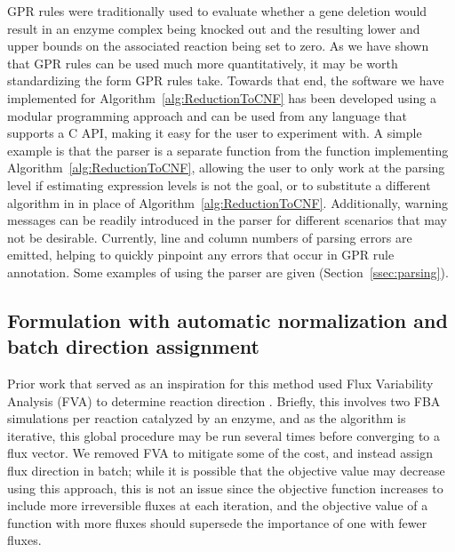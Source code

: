 GPR rules were traditionally used to evaluate whether a gene deletion
would result in an enzyme complex being knocked out and the resulting
lower and upper bounds on the associated reaction being set to
zero. As we have shown that GPR rules can be used much more
quantitatively, it may be worth standardizing the form GPR rules
take. Towards that end, the software we have implemented for
Algorithm~\ref{alg:ReductionToCNF} has been developed using a modular
programming approach and can be used from any language that supports
a C API, making it easy for the user to experiment
with. A simple example is that the parser is a separate function from
the function implementing Algorithm~\ref{alg:ReductionToCNF}, allowing
the user to only work at the parsing level if estimating expression
levels is not the goal, or to substitute a different algorithm in in
place of Algorithm~\ref{alg:ReductionToCNF}. Additionally, warning
messages can be readily introduced in the parser for different
scenarios that may not be desirable. Currently, line and column
numbers of parsing errors are emitted, helping to quickly pinpoint any
errors that occur in GPR rule annotation. Some examples of using
the parser are given (\suppOrApp Section~\ref{ssec:parsing}).

\subsection{Formulation with automatic normalization and batch direction assignment}

Prior work that served as an inspiration for this method used Flux
Variability Analysis (FVA) to determine reaction direction
\citep{Lee2012}. Briefly, this involves two FBA simulations per
reaction catalyzed by an enzyme, and as the algorithm is iterative,
this global procedure may be run several times before converging to a
flux vector. We removed FVA to mitigate some
of the cost, and instead assign flux direction in batch; while it is
possible that the objective value may decrease using this approach,
this is not an issue since the objective function increases to include
more irreversible fluxes at each iteration, and the objective value of
a function with more fluxes should supersede the importance of one
with fewer fluxes.
 
